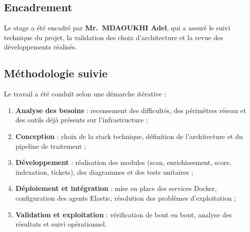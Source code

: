 \subsection{Encadrement}

Le stage a \'et\'e encadr\'e par \textbf{Mr.~MDAOUKHI Adel}, qui a assur\'e le
suivi technique du projet, la validation des choix d'architecture et la revue
des d\'eveloppements r\'ealis\'es.

\subsection{M\'ethodologie suivie}

Le travail a \'et\'e conduit selon une d\'emarche it\'erative :

\begin{enumerate}[leftmargin=1.6em]
  \item \textbf{Analyse des besoins} : recensement des difficult\'es, des
        p\'erim\`etres r\'eseau et des outils d\'ej\`a pr\'esents sur
        l'infrastructure ;
  \item \textbf{Conception} : choix de la stack technique, d\'efinition de
        l'architecture et du pipeline de traitement ;
  \item \textbf{D\'eveloppement} : r\'ealisation des modules (scan,
        enrichissement, score, indexation, tickets), des diagrammes et des
        tests unitaires ;
  \item \textbf{D\'eploiement et int\'egration} : mise en place des services
        Docker, configuration des agents Elastic, r\'esolution des
        probl\`emes d'exploitation ;
  \item \textbf{Validation et exploitation} : v\'erification de bout en bout,
        analyse des r\'esultats et suivi op\'erationnel.
\end{enumerate}
